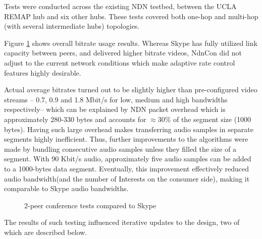 \documentclass{icn/sig-alternate-2012} %
\begin{document}
Tests were conducted across the existing NDN testbed, between the UCLA REMAP hub and six other hubs. These tests covered both one-hop and multi-hop (with several intermediate hubs) topologies.

Figure \ref{fig:tests-skype} shows overall bitrate usage results. Whereas Skype has fully utilized link capacity between peers, and delivered higher bitrate videos, NdnCon did not adjust to the current network conditions which make adaptive rate control features highly desirable.

Actual average bitrates turned out to be slightly higher than pre-configured video streams -- 0.7, 0.9 and 1.8 Mbit/s for low, medium and high bandwidths respectively-- which can be explained by NDN packet overhead which is approximately 280-330 bytes and accounts for $\approx$30\% of the segment size (1000 bytes). Having such large overhead makes transferring audio samples in separate segments highly inefficient. Thus, further improvements to the algorithms were made by bundling consecutive audio samples unless they filled the size of a segment. With 90 Kbit/s audio, approximately five audio samples can be added to a 1000-bytes data segment. Eventually, this improvement effectively reduced audio bandwidth(and the number of Interests on the consumer side), making it comparable to Skype audio bandwidths.

\begin{figure}[t!]
\centering
\begin{tiny}
\def\svgwidth{0.5\textwidth}
\end{tiny}
\vspace{-18pt}
\caption{2-peer conference tests compared to Skype}
\label{fig:tests-skype}
\end{figure}


The results of such testing influenced iterative updates to the design, two of which are described below. 
\end{document}
